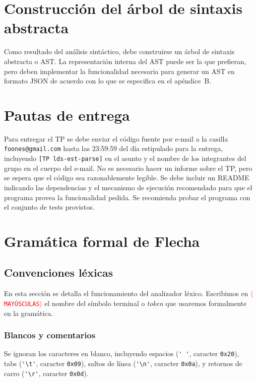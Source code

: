 \documentclass{article}
\newcommand{\flecha}{\textsf{Flecha}\xspace}
\newcommand{\tok}[1]{\textcolor{red}{{\texttt{$\langle$#1$\rangle$}}}}
\begin{document}
\section{Construcción del árbol de sintaxis abstracta}

Como resultado del análisis sintáctico, debe construirse un árbol
de sintaxis abstracta o AST.
La representación interna del AST puede ser la que prefieran,
pero deben implementar la funcionalidad necesaria para generar
un AST en formato JSON de acuerdo con lo que se especifica en el
apéndice~B.

\section{Pautas de entrega}

Para entregar el TP se debe enviar el c\'odigo fuente por e-mail
a la casilla \texttt{foones@gmail.com} hasta las 23:59:59 del d\'ia
estipulado para la entrega, incluyendo \texttt{[TP lds-est-parse]} en
el asunto y el nombre de los integrantes del grupo en el cuerpo
del e-mail. No es necesario hacer un informe sobre el TP, pero se espera
que el c\'odigo sea razonablemente legible.
Se debe incluir un README
indicando las dependencias y el mecanismo de ejecuci\'on
recomendado para que el programa provea la funcionalidad pedida.
Se recomienda probar el programa con el conjunto de tests provistos.

\appendix

\section{Gramática formal de \flecha}

\subsection{Convenciones léxicas}

En esta sección se detalla el funcionamiento del analizador léxico.
Escribimos en \tok{MAYÚSCULAS} el nombre del símbolo terminal o {\em token}
que usaremos formalmente en la gramática.

\subsubsection*{Blancos y comentarios}
  Se ignoran los caracteres en blanco, incluyendo
  espacios (\verb|' '|, caracter \texttt{0x20}),
  tabs (\verb|'\t'|, caracter \texttt{0x09}),
  saltos de línea (\verb|'\n'|, caracter \texttt{0x0a}),
  y retornos de carro (\verb|'\r'|, caracter \texttt{0x0d}).
\end{document}
